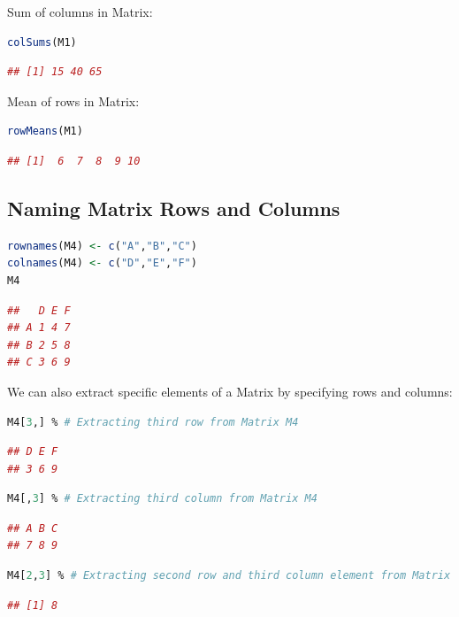 \documentclass[10pt]{book}
\begin{document}
Sum of columns in Matrix:
\begin{lstlisting}[language=R]
colSums(M1)
\end{lstlisting}
\begin{lstlisting}[language=R]
## [1] 15 40 65
\end{lstlisting}

Mean of rows in Matrix:
\begin{lstlisting}[language=R]
rowMeans(M1)
\end{lstlisting}
\begin{lstlisting}[language=R]
## [1]  6  7  8  9 10
\end{lstlisting}

\subsection{Naming Matrix Rows and Columns}
\begin{lstlisting}[language=R]
rownames(M4) <- c("A","B","C")
colnames(M4) <- c("D","E","F")
M4
\end{lstlisting}
\begin{lstlisting}[language=R]
##   D E F
## A 1 4 7
## B 2 5 8
## C 3 6 9
\end{lstlisting}

We can also extract specific elements of a Matrix by specifying rows and columns:

\begin{lstlisting}[language=R]
M4[3,] % # Extracting third row from Matrix M4
\end{lstlisting}
\begin{lstlisting}[language=R]
## D E F 
## 3 6 9
\end{lstlisting}
\begin{lstlisting}[language=R]
M4[,3] % # Extracting third column from Matrix M4
\end{lstlisting}
\begin{lstlisting}[language=R]
## A B C 
## 7 8 9
\end{lstlisting}
\begin{lstlisting}[language=R]
M4[2,3] % # Extracting second row and third column element from Matrix M4
\end{lstlisting}
\begin{lstlisting}[language=R]
## [1] 8
\end{lstlisting}
\end{document}

